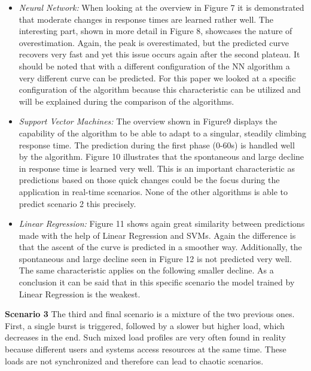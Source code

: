 \begin{itemize}
\item \textit{Neural Network:} When looking at the overview in Figure 7 it is demonstrated that moderate changes in response times are learned rather well. The interesting part, shown in more detail in Figure 8, showcases the nature of overestimation. Again, the peak is overestimated, but the predicted curve recovers very fast and yet this issue occurs again after the second plateau. It should be noted that with a different configuration of the NN algorithm a very different curve can be predicted. For this paper we looked at a specific configuration of the algorithm because this characteristic can be utilized and will be explained during the comparison of the algorithms.

\item \textit{Support Vector Machines:} The overview shown in Figure9 displays the capability of the algorithm to be able to adapt to a singular, steadily climbing response time. The prediction during the first phase (0-60s) is handled well by the algorithm. Figure 10 illustrates that the spontaneous and large decline in response time is learned very well. This is an important characteristic as predictions based on those quick changes could be the focus during the application in real-time scenarios. None of the other algorithms is able to predict scenario 2 this precisely.

\item \textit{Linear Regression:} Figure 11 shows again great similarity between predictions made with the help of Linear Regression and SVMs. Again the difference is that the ascent of the curve is predicted in a smoother way. Additionally, the spontaneous and large decline seen in Figure 12 is not predicted very well. The same characteristic applies on the following smaller decline. As a conclusion it can be said that in this specific scenario the model trained by Linear Regression is the weakest. 
\end{itemize}

\textbf{Scenario 3} 
The third and final scenario is a mixture of the two previous ones. First, a single burst is triggered, followed by a slower but higher load, which decreases in the end. Such mixed load profiles are very often found in reality because different users and systems access resources at the same time. These loads are not synchronized and therefore can lead to chaotic scenarios.

